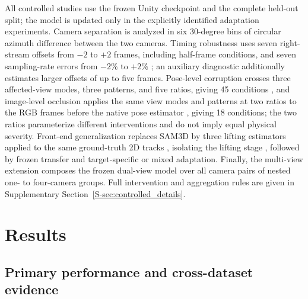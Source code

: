\documentclass[preprint,12pt]{elsarticle}
\providecommand{\DIFaddbegin}{} %
\providecommand{\DIFaddend}{} %
\providecommand{\DIFadd}[1]{{\protect\color{blue}#1}} %
\begin{document}
 \DIFaddbegin \DIFadd{All controlled studies use the frozen Unity checkpoint and the complete held-out split; the model is updated only in }\DIFaddend the explicitly identified adaptation experiments.  \DIFaddbegin \DIFadd{Camera separation is analyzed in }\DIFaddend six 30-degree bins of circular  \DIFaddbegin \DIFadd{azimuth difference between the two cameras. Timing robustness uses seven right-stream offsets from }\DIFaddend \(-2\) to \(+2\) frames\DIFaddbegin \DIFadd{, including half-frame conditions, }\DIFaddend and seven sampling-rate errors  \DIFaddbegin \DIFadd{from }\DIFaddend \(-2\%\) to \(+2\%\) \DIFaddbegin \DIFadd{; an auxiliary diagnostic additionally }\DIFaddend estimates larger offsets \DIFaddbegin \DIFadd{of }\DIFaddend up to five frames.  \DIFaddbegin \DIFadd{Pose-level corruption crosses }\DIFaddend three affected-view modes, three  patterns, and five  \DIFaddbegin \DIFadd{ratios, giving }\DIFaddend 45 conditions \DIFaddbegin \DIFadd{, and image-level occlusion applies }\DIFaddend the same view modes and  \DIFaddbegin \DIFadd{patterns }\DIFaddend at two ratios  \DIFaddbegin \DIFadd{to the RGB frames }\DIFaddend before the native pose estimator \DIFaddbegin \DIFadd{, giving 18 conditions; the two ratios parameterize }\DIFaddend different interventions and do not imply equal physical severity.  \DIFaddbegin \DIFadd{Front-end generalization replaces SAM3D by three lifting estimators applied to }\DIFaddend the same ground-truth 2D tracks \DIFaddbegin \DIFadd{, isolating }\DIFaddend the lifting stage \DIFaddbegin \DIFadd{, followed by frozen transfer and target-specific or mixed adaptation. Finally, the multi-view extension composes the }\DIFaddend frozen dual-view model  over all camera pairs  \DIFaddbegin \DIFadd{of nested one- to four-camera groups. Full intervention and aggregation rules are given in Supplementary Section~\ref{S-sec:controlled_details}.
}\DIFaddend 

\section{Results}
\label{sec:results}

\subsection{Primary performance and cross-dataset evidence}
\end{document}
